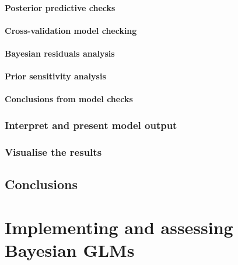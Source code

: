 \documentclass[
]{book}
\begin{document}
\hypertarget{gamma-ppc}{%
\subsubsection{Posterior predictive checks}\label{gamma-ppc}}

\hypertarget{gamma-cv}{%
\subsubsection{Cross-validation model checking}\label{gamma-cv}}

\hypertarget{gamma-resids}{%
\subsubsection{Bayesian residuals analysis}\label{gamma-resids}}

\hypertarget{gamma-sens}{%
\subsubsection{Prior sensitivity analysis}\label{gamma-sens}}

\hypertarget{gamma-checkconc}{%
\subsubsection{Conclusions from model checks}\label{gamma-checkconc}}

\hypertarget{gamma-present}{%
\subsection{Interpret and present model output}\label{gamma-present}}

\hypertarget{visualise-the-results-4}{%
\subsection{Visualise the results}\label{visualise-the-results-4}}

\hypertarget{conclusions-5}{%
\section{Conclusions}\label{conclusions-5}}

\hypertarget{implementing-and-assessing-bayesian-glms}{%
\chapter{Implementing and assessing Bayesian
GLMs}\label{implementing-and-assessing-bayesian-glms}}
\end{document}
